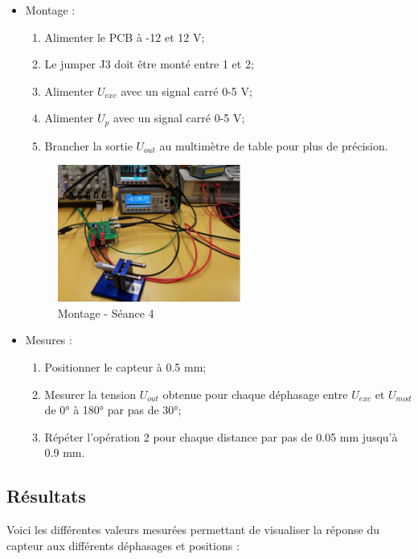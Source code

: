 \begin{itemize}
    \item Montage : 
    \begin{enumerate}
    \item Alimenter le PCB à -12 et 12 V;
    \item Le jumper J3 doit être monté entre 1 et 2; 
    \item Alimenter $U_{exc}$ avec un signal carré 0-5 V;
    \item Alimenter $U_{p}$ avec un signal carré 0-5 V;
    \item Brancher la sortie $U_{out}$ au multimètre de table pour plus de précision.
\end{enumerate}


\begin{figure}[H]
    \centering
    \includegraphics[width=6cm]{Images/Seance4/MT4.jpg}
    \caption{Montage - Séance 4  }
    \label{fig:lum}
\end{figure}
\item Mesures :
\begin{enumerate}
    \item Positionner le capteur à 0.5 mm;
    \item Mesurer la tension $U_{out}$ obtenue pour chaque déphasage entre $U_{exc}$ et $U_{mod}$
    de 0° à 180° par pas de 30°;
    \item Répéter l'opération 2 pour chaque distance par pas de 0.05 mm jusqu'à 0.9 mm.
\end{enumerate}
\end{itemize}

\subsection{Résultats}


Voici les différentes valeurs mesurées permettant de visualiser la réponse du capteur aux différents
déphasages et positions :

